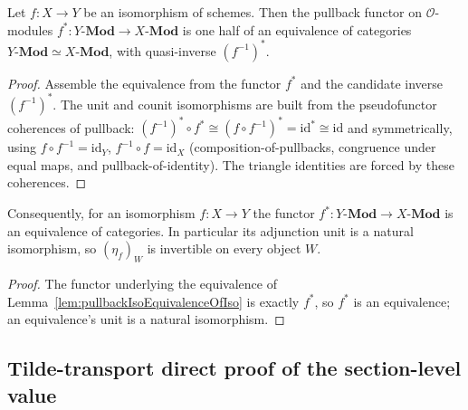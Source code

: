 
\begin{lemma}
  \label{lem:pullbackIsoEquivalenceOfIso}
  Let \(f : X \to Y\) be an isomorphism of schemes. Then the pullback functor on
  \(\mathcal{O}\)-modules \(f^* : Y\text{-}\mathbf{Mod} \to X\text{-}\mathbf{Mod}\) is
  one half of an equivalence of categories
  \(Y\text{-}\mathbf{Mod} \simeq X\text{-}\mathbf{Mod}\), with quasi-inverse
  \((f^{-1})^*\).
\end{lemma}
\begin{proof}

  Assemble the equivalence from the functor \(f^*\) and the candidate inverse
  \((f^{-1})^*\). The unit and counit isomorphisms are built from the pseudofunctor
  coherences of pullback: \((f^{-1})^* \circ f^* \cong (f \circ f^{-1})^* = \mathrm{id}^*
  \cong \mathrm{id}\) and symmetrically, using
  \(f \circ f^{-1} = \mathrm{id}_Y\), \(f^{-1} \circ f = \mathrm{id}_X\)
  (composition-of-pullbacks, congruence under equal maps, and pullback-of-identity).
  The triangle identities are forced by these coherences.
\end{proof}

\begin{lemma}
  \label{lem:pullback_isEquivalence_of_iso}
  Consequently, for an isomorphism \(f : X \to Y\) the functor
  \(f^* : Y\text{-}\mathbf{Mod} \to X\text{-}\mathbf{Mod}\) is an equivalence of
  categories. In particular its adjunction unit is a natural isomorphism, so
  \((\eta_{f})_{W}\) is invertible on every object \(W\).
\end{lemma}
\begin{proof}

  The functor underlying the equivalence of
  Lemma~\ref{lem:pullbackIsoEquivalenceOfIso} is exactly \(f^*\), so \(f^*\) is an
  equivalence; an equivalence's unit is a natural isomorphism.
\end{proof}

\subsection{Tilde-transport direct proof of the section-level value}
\label{sec:fbc_tilde_transport_direct}

